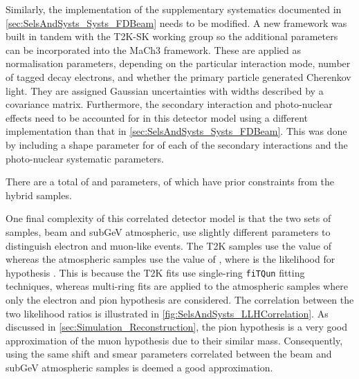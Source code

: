 Similarly, the implementation of the supplementary systematics documented in \autoref{sec:SelsAndSysts_Systs_FDBeam} needs to be modified. A new framework \cite{t2ksk-common} was built in tandem with the T2K-SK working group \cite{t2k_tn_399} so the additional parameters can be incorporated into the MaCh3 framework. These are applied as normalisation parameters, depending on the particular interaction mode, number of tagged decay electrons, and whether the primary particle generated Cherenkov light. They are assigned Gaussian uncertainties with widths described by a covariance matrix. Furthermore, the secondary interaction and photo-nuclear effects need to be accounted for in this detector model using a different implementation than that in \autoref{sec:SelsAndSysts_Systs_FDBeam}. This was done by including a shape parameter for of each of the secondary interactions and the photo-nuclear systematic parameters.

There are a total of   and  parameters, of which  have prior constraints from the hybrid  samples.

One final complexity of this correlated detector model is that the two sets of samples, beam and subGeV atmospheric, use slightly different parameters to distinguish electron and muon-like events. The T2K samples use the value of  whereas the atmospheric samples use the value of , where  is the likelihood for hypothesis . This is because the T2K fits use single-ring \texttt{fiTQun} fitting techniques, whereas multi-ring fits are applied to the atmospheric samples where only the electron and pion hypothesis are considered. The correlation between the two likelihood ratios is illustrated in \autoref{fig:SelsAndSysts_LLHCorrelation}. As discussed in \autoref{sec:Simulation_Reconstruction}, the pion hypothesis is a very good approximation of the muon hypothesis due to their similar mass. Consequently, using the same shift and smear parameters correlated between the beam and subGeV atmospheric samples is deemed a good approximation.

